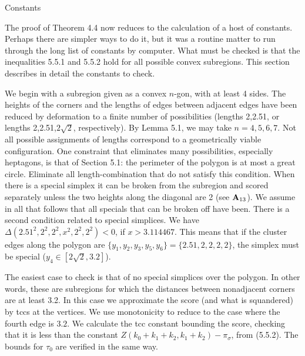 \subhead {} Constants\endsubhead

The proof of Theorem 4.4 now reduces to the calculation of a host of
constants.  Perhaps there are simpler ways to do it, but it was
a routine matter to run through the long list of constants by computer.  
What
must be checked is that the inequalities 5.5.1 and 5.5.2 hold for
all possible convex subregions.   This section describes in
detail the constants to check.

We begin with a subregion given as a convex $n$-gon, with at least
4 sides.   The heights
of the corners and the lengths of edges between adjacent edges
have been reduced by deformation to a finite number of possibilities 
(lengths 2,2.51, or lengths 2,2.51,$2\sqrt{2}$, respectively).
By Lemma 5.1, we may take $n=4,5,6,7$.   Not all possible assignments of
lengths correspond to a geometrically viable configuration.
One constraint that eliminates many possibilities, especially heptagons,
is that of Section 5.1: the perimeter of the polygon is at most
a great circle.  Eliminate all length-combination that do not
satisfy this condition.  When there is a special simplex it can be
broken from the subregion and scored separately unless the two heights
along the diagonal are 2 (see ${\bold A}_{13}$).  
We assume in all that follows that
all specials that can be broken off have been.
There is a second condition related to
special simplices.  We have $\Delta(2.51^2,2^2,2^2,x^2,2^2,2^2)<0$,
if $x> 3.114467$.  This means that if the cluster edges 
along the polygon are $\{y_1,y_2,y_3,y_5,y_6\}= \{2.51,2,2,2,2\}$,
the simplex must be special ($y_4\in[2\sqrt{2},3.2]$).


The easiest case
to check is that of no special simplices over the polygon.  In other
words, these are subregions for which the distances between nonadjacent
corners are at least 3.2.  In this case we approximate the score
(and what is squandered) by tccs at the vertices.  We use
monotonicity to reduce to the case where the fourth edge is $3.2$.
We calculate the tcc constant bounding the score, checking that
it is less than the constant
	$ Z(k_0+k_1+k_2,k_1+k_2) - \pi_\sigma$, from 
(5.5.2).
The bounds for $\tau_0$ are verified in the same way.

